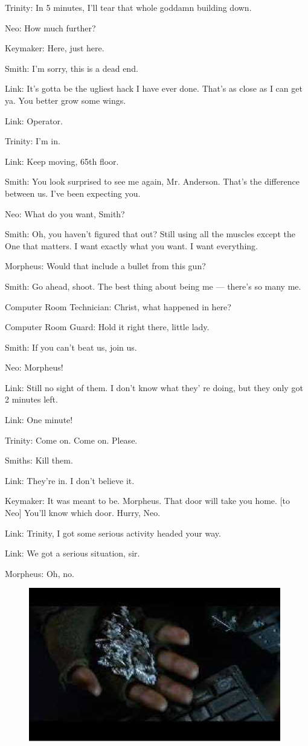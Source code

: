 \documentclass{ctexart}
\newenvironment{myquote}{\color{green} \setlength{\leftskip}{6em} \setlength{\rightskip}{4em} \setlength{\parindent}{-2em}}{\par}
\begin{document}
\begin{myquote}
Trinity: In 5 minutes, I'll tear that whole goddamn building down.

Neo: How much further?

Keymaker: Here, just here.

Smith: I'm sorry, this is a dead end.

Link: It's gotta be the ugliest hack I have ever done. That's as close as I can get ya. You better grow some wings.

Link: Operator.

Trinity: I'm in.

Link: Keep moving, 65th floor.

Smith: You look surprised to see me again, Mr. Anderson. That's the difference between us. I've been expecting you.

Neo: What do you want, Smith?

Smith: Oh, you haven't figured that out? Still using all the muscles except the One that matters. I want exactly what you want. I want everything.

Morpheus: Would that include a bullet from this gun?

Smith: Go ahead, shoot. The best thing about being me --- there's so many me.

Computer Room Technician: Christ, what happened in here?

Computer Room Guard: Hold it right there, little lady.

Smith: If you can't beat us, join us.

Neo: Morpheus!

Link: Still no sight of them. I don't know what they' re doing, but they only got 2 minutes left.

Link: One minute!

Trinity: Come on. Come on. Please.

Smiths: Kill them.

Link: They're in. I don't believe it.

Keymaker: It was meant to be. Morpheus. That door will take you home. [to Neo] You'll know which door. Hurry, Neo.

Link: Trinity, I got some serious activity headed your way.

Link: We got a serious situation, sir.

Morpheus: Oh, no.
\end{myquote}

\begin{figure}[htb]
\centering
\includegraphics[width=0.5\linewidth]{fig/read_reloaded-147}
\end{figure}
\end{document}
